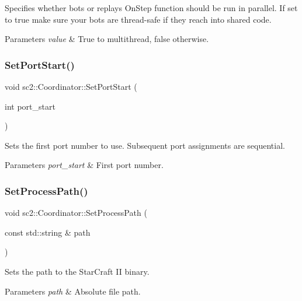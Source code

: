 Specifies whether bots or replays On\+Step function should be run in parallel. If set to true make sure your bots are thread-\/safe if they reach into shared code. 
\begin{DoxyParams}{Parameters}
{\em value} & True to multithread, false otherwise. \\
\hline
\end{DoxyParams}
\mbox{\label{classsc2_1_1_coordinator_aaad48921bac2f4f84471de5e9cff75d5}} 
\subsubsection{\texorpdfstring{Set\+Port\+Start()}{SetPortStart()}}
{\footnotesize\ttfamily void sc2\+::\+Coordinator\+::\+Set\+Port\+Start (\begin{DoxyParamCaption}\item[{int}]{port\+\_\+start }\end{DoxyParamCaption})}

Sets the first port number to use. Subsequent port assignments are sequential. 
\begin{DoxyParams}{Parameters}
{\em port\+\_\+start} & First port number. \\
\hline
\end{DoxyParams}
\mbox{\label{classsc2_1_1_coordinator_ad906656238e13a8bab21c46f50aecc3d}} 
\subsubsection{\texorpdfstring{Set\+Process\+Path()}{SetProcessPath()}}
{\footnotesize\ttfamily void sc2\+::\+Coordinator\+::\+Set\+Process\+Path (\begin{DoxyParamCaption}\item[{const std\+::string \&}]{path }\end{DoxyParamCaption})}

Sets the path to the Star\+Craft II binary. 
\begin{DoxyParams}{Parameters}
{\em path} & Absolute file path. \\
\hline
\end{DoxyParams}
\mbox{\label{classsc2_1_1_coordinator_a602e6ead93e360771ce36d6ac782fc2a}} 
